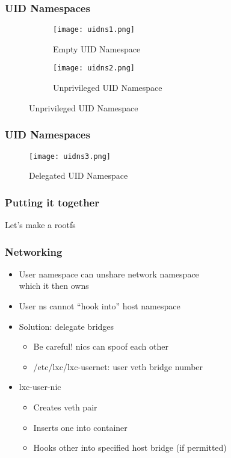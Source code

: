 \documentclass{beamer}
\begin{document}
\begin{frame}
\frametitle{UID Namespaces}
\begin{figure}
\centering
\begin{subfigure}{.5\textwidth}
\centering
	\texttt{[image: uidns1.png]}
	\caption{Empty UID Namespace}
\end{subfigure}%
\begin{subfigure}{.5\textwidth}
\centering
	\texttt{[image: uidns2.png]}
	\caption{Unprivileged UID Namespace}
\end{subfigure}
\end{figure}
\end{frame}

\begin{frame}
\frametitle{UID Namespaces}
\begin{figure}
	\texttt{[image: uidns3.png]}
	\caption{Delegated UID Namespace}
\end{figure}
\end{frame}



\begin{frame}
\frametitle{Putting it together}
Let's make a rootfs
\end{frame}

\begin{frame}
\frametitle{Networking}
	\begin{itemize}
	\item User namespace can unshare network namespace \\
		which it then owns
	\item User ns cannot ``hook into'' host namespace
	\item Solution: delegate bridges
		\begin{itemize}
		\item Be careful! nics can spoof each other
		\item /etc/lxc/lxc-usernet: user veth bridge number
		\end{itemize}
	\item lxc-user-nic
		\begin{itemize}
		\item Creates veth pair
		\item Inserts one into container
		\item Hooks other into specified host bridge (if permitted)
		\end{itemize}
	\end{itemize}
\end{frame}
\end{document}
